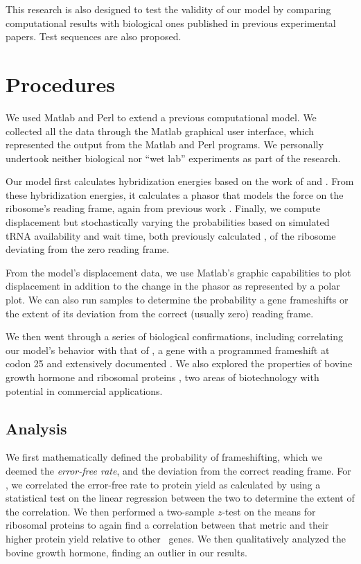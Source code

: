 \documentclass[article, oneside]{memoir}
\begin{document}
This research is also designed to test the validity of our model
by comparing computational results with biological ones published in previous
experimental papers.  Test sequences are also proposed.


\section{Procedures}
We used Matlab and Perl to extend a previous computational model. We
collected all the data through the Matlab graphical user interface,
which represented the output from the Matlab and Perl programs. We
personally undertook neither biological nor ``wet lab'' experiments as
part of the research.

Our model first calculates hybridization energies based on the work of
\citet{freier} and \citet{starmer}. From these hybridization energies,
it calculates a phasor that models the force on the ribosome's reading
frame, again from previous work \cite{lalit:mechanics}. Finally, we
compute displacement but stochastically varying the probabilities
based on simulated tRNA availability and wait time, both previously
calculated \cite{ikemura, lalit:mechanics}, of the ribosome deviating
from the zero reading frame.

From the model's displacement data, we use Matlab's graphic
capabilities to plot displacement in addition to the change in the
phasor as represented by a polar plot. We can also run samples to
determine the probability a gene frameshifts or the extent of its
deviation from the correct (usually zero) reading frame.

We then went through a series of biological confirmations, including
correlating our model's behavior with that of \prfB, a gene with a
programmed frameshift at codon 25 and extensively documented
\cite{weiss87}. We also explored the properties of bovine growth
hormone \cite{schoner:bgh} and ribosomal proteins \cite{rpoS:process},
two areas of biotechnology with potential in commercial applications.

\subsection{Analysis}
We first mathematically defined the probability of frameshifting,
which we deemed the \emph{error-free rate}, and the deviation from the
correct reading frame. For \prfB, we correlated the error-free rate to
protein yield as calculated by \citet{weiss87} using a statistical
test on the linear regression between the two to determine the extent
of the correlation. We then performed a two-sample $z$-test on the
means for ribosomal proteins to again find a correlation between that
metric and their higher protein yield relative to other \ecoli\ genes.
We then qualitatively analyzed the bovine growth hormone, finding an
outlier in our results.

{}

\end{document}
